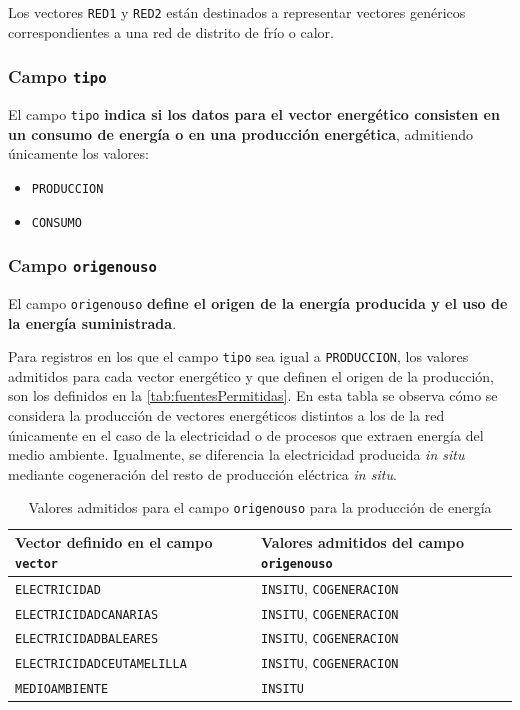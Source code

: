 \documentclass[10pt,notitlepage,oneside,a4paper]{article}
\begin{document}
Los vectores \texttt{RED1} y \texttt{RED2} están destinados a representar vectores genéricos correspondientes a una red de distrito de frío o calor.

\subsubsection{Campo \texttt{tipo}}

El campo \texttt{tipo} \textbf{indica si los datos para el vector energético consisten en un consumo de energía o en una producción energética}, admitiendo únicamente los valores:

\begin{itemize}
\item \texttt{PRODUCCION}
\item \texttt{CONSUMO}
\end{itemize}

\subsubsection{Campo \texttt{origenouso}}

El campo \texttt{origenouso} \textbf{define el origen de la energía producida y el uso de la energía suministrada}.

Para registros en los que el campo \texttt{tipo} sea igual a \texttt{PRODUCCION}, los valores admitidos para cada vector energético y que definen el origen de la producción, son los definidos en la \autoref{tab:fuentesPermitidas}. En esta tabla se observa cómo se considera la producción de vectores energéticos distintos a los de la red únicamente en el caso de la electricidad o de procesos que extraen energía del medio ambiente. Igualmente, se diferencia la electricidad producida \textit{in situ} mediante cogeneración del resto de producción eléctrica \textit{in situ}.

\begin{table}[H]
\centering
\small
\caption{Valores admitidos para el campo \texttt{origenouso} para la producción de energía}\label{tab:fuentesPermitidas}
\begin{tabular}{ll}
    \toprule
    \textbf{Vector definido en el campo \texttt{vector}} & \textbf{Valores admitidos del campo \texttt{origenouso}}\\
    \midrule
    \texttt{ELECTRICIDAD}             & \texttt{INSITU}, \texttt{COGENERACION}\\
    \texttt{ELECTRICIDADCANARIAS}     & \texttt{INSITU}, \texttt{COGENERACION}\\
    \texttt{ELECTRICIDADBALEARES}     & \texttt{INSITU}, \texttt{COGENERACION}\\
    \texttt{ELECTRICIDADCEUTAMELILLA} & \texttt{INSITU}, \texttt{COGENERACION}\\
    \texttt{MEDIOAMBIENTE}            & \texttt{INSITU}\\
    \bottomrule
\end{tabular}
\end{table}
\end{document}
